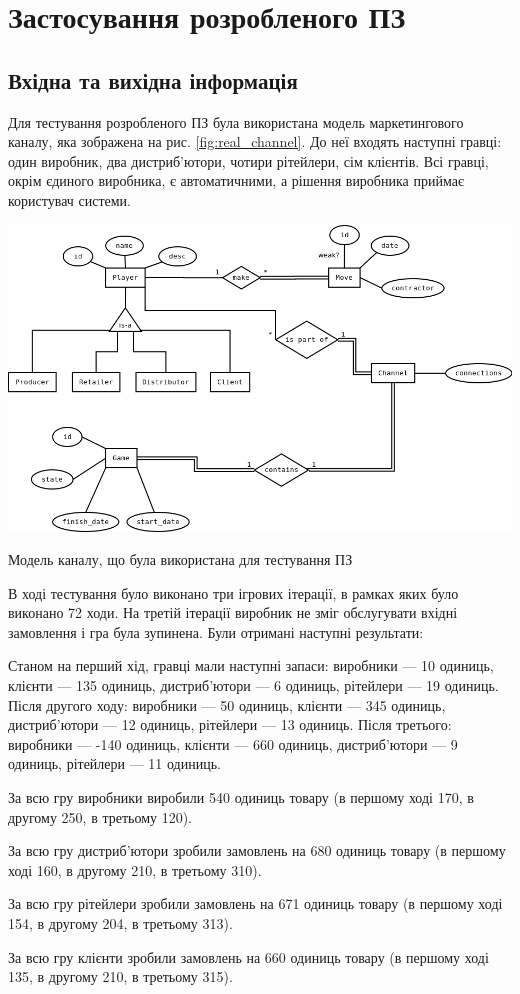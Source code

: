 \section{Застосування розробленого ПЗ}
\subsection{Вхідна та вихідна інформація}

Для тестування розробленого ПЗ була використана модель маркетингового каналу, яка зображена на рис. \ref{fig:real_channel}. До неї входять наступні гравці: один виробник, два дистриб’ютори, чотири рітейлери, сім клієнтів. Всі гравці, окрім єдиного виробника, є автоматичними, а рішення виробника приймає користувач системи.

\begin{stdfigure}
    \includegraphics[width=7in]{images/er.png}
    \caption{Модель каналу, що була використана для тестування ПЗ}
    \label{fig:real_channel}
\end{stdfigure}

В ході тестування було виконано три ігрових ітерації, в рамках яких було виконано 72 ходи. На третій ітерації виробник не зміг обслугувати вхідні замовлення і гра була зупинена. Були отримані наступні результати:
\begin{longEnumerate}
\item Станом на перший хід, гравці мали наступні запаси: виробники --- 10 одиниць, клієнти --- 135 одиниць, дистриб’ютори --- 6 одиниць, рітейлери --- 19 одиниць. Після другого ходу: виробники --- 50 одиниць, клієнти --- 345 одиниць, дистриб’ютори --- 12 одиниць, рітейлери --- 13 одиниць. Після третього: виробники --- -140 одиниць, клієнти --- 660 одиниць, дистриб’ютори --- 9 одиниць, рітейлери --- 11 одиниць.
\item За всю гру виробники виробили 540 одиниць товару (в першому ході 170, в другому 250, в третьому 120).
\item За всю гру дистриб’ютори зробили замовлень на 680 одиниць товару (в першому ході 160, в другому 210, в третьому 310).
\item За всю гру рітейлери зробили замовлень на 671 одиниць товару (в першому ході 154, в другому 204, в третьому 313).
\item За всю гру клієнти зробили замовлень на 660 одиниць товару (в першому ході 135, в другому 210, в третьому 315).
\end{longEnumerate}

